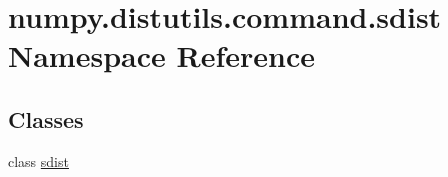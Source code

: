 \hypertarget{namespacenumpy_1_1distutils_1_1command_1_1sdist}{}\section{numpy.\+distutils.\+command.\+sdist Namespace Reference}
\label{namespacenumpy_1_1distutils_1_1command_1_1sdist}
\subsection*{Classes}
\begin{DoxyCompactItemize}
\item 
class \hyperlink{classnumpy_1_1distutils_1_1command_1_1sdist_1_1sdist}{sdist}
\end{DoxyCompactItemize}
